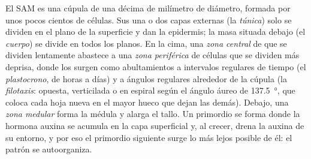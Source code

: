 \begin{proposition}\label{prop:b2:plant-meristems:sam}
El SAM es una cúpula de una décima de milímetro de diámetro, formada por
unos pocos cientos de células. Sus una o dos capas externas (la
\emph{túnica}) solo se dividen en el plano de la superficie y dan la
epidermis; la masa situada debajo (el \emph{cuerpo}) se divide en todos
los planos. En la cima, una \emph{zona central} de  que se
dividen lentamente abastece a una \emph{zona periférica} de células que se
dividen más deprisa, donde los \emph{} surgen como
abultamientos a intervalos regulares de tiempo (el \emph{plastocrono}, de
horas a días) y a ángulos regulares alrededor de la cúpula (la
\emph{filotaxis}: opuesta, verticilada o en espiral según el ángulo áureo
de \qty{137.5}{\degree}, que coloca cada hoja nueva en el mayor hueco que
dejan las demás). Debajo, una \emph{zona medular} forma la médula y alarga
el tallo. Un primordio se forma donde la hormona auxina se acumula en la
capa superficial y, al crecer, drena la auxina de su entorno, y por eso el
primordio siguiente surge lo más lejos posible de él: el patrón se
autoorganiza.
\end{proposition}

